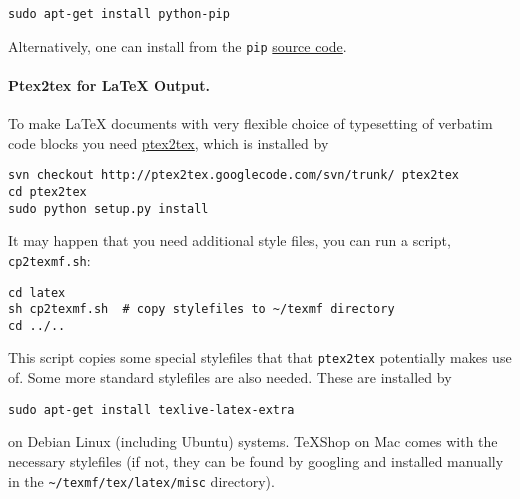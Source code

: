 \documentclass[twoside]{article}
\begin{document}
\vspace{4pt}
\begin{Verbatim}[numbers=none,frame=lines,label=\fbox{{\tiny Terminal}},fontsize=\fontsize{9pt}{9pt},
labelposition=topline,framesep=2.5mm,framerule=0.7pt]
sudo apt-get install python-pip
\end{Verbatim}
Alternatively, one can install from the {\fontsize{10pt}{10pt}\verb!pip!} \href{{http://pypi.python.org/pypi/pip}}{source code}.

\paragraph{Ptex2tex for {\LaTeX} Output.}
To make {\LaTeX} documents with very flexible choice of typesetting of
verbatim code blocks you need \href{{http://code.google.com/p/ptex2tex}}{ptex2tex},
which is installed by

\vspace{4pt}
\begin{Verbatim}[numbers=none,frame=lines,label=\fbox{{\tiny Terminal}},fontsize=\fontsize{9pt}{9pt},
labelposition=topline,framesep=2.5mm,framerule=0.7pt]
svn checkout http://ptex2tex.googlecode.com/svn/trunk/ ptex2tex
cd ptex2tex
sudo python setup.py install
\end{Verbatim}
It may happen that you need additional style files, you can run
a script, {\fontsize{10pt}{10pt}\verb!cp2texmf.sh!}:

\vspace{4pt}
\begin{Verbatim}[numbers=none,frame=lines,label=\fbox{{\tiny Terminal}},fontsize=\fontsize{9pt}{9pt},
labelposition=topline,framesep=2.5mm,framerule=0.7pt]
cd latex
sh cp2texmf.sh  # copy stylefiles to ~/texmf directory
cd ../..
\end{Verbatim}
This script copies some special stylefiles that
that {\fontsize{10pt}{10pt}\verb!ptex2tex!} potentially makes use of. Some more standard stylefiles
are also needed. These are installed by

\vspace{4pt}
\begin{Verbatim}[numbers=none,frame=lines,label=\fbox{{\tiny Terminal}},fontsize=\fontsize{9pt}{9pt},
labelposition=topline,framesep=2.5mm,framerule=0.7pt]
sudo apt-get install texlive-latex-extra
\end{Verbatim}
on Debian Linux (including Ubuntu) systems. TeXShop on Mac comes with
the necessary stylefiles (if not, they can be found by googling and installed
manually in the {\fontsize{10pt}{10pt}\verb!~/texmf/tex/latex/misc!} directory).
\end{document}
